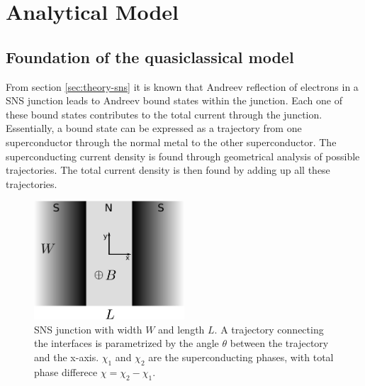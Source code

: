 \chapter{Analytical Model}
\label{ch:analyticalmodel}

\section{Foundation of the quasiclassical model}
From section \ref{sec:theory-sns} it is known that Andreev reflection of electrons in a SNS junction leads to Andreev bound states within the junction. Each one of these bound states contributes to the total current through the junction. Essentially, a bound state can be expressed as a trajectory from one superconductor through the normal metal to the other superconductor. The superconducting current density is found through geometrical analysis of possible trajectories. The total current density is then found by adding up all these trajectories.
\begin{figure}[h]
\centering	
\includegraphics[width=0.5\textwidth]{figure/analyticalmodel/sns_junction}
\caption{SNS junction with width $W$ and length $L$. A trajectory connecting the interfaces is parametrized by the angle $\theta$ between the trajectory and the x-axis. $\chi_1$ and $\chi_2$ are the superconducting phases, with total phase differece $\chi = \chi_2 - \chi_1$.}
\label{fig:sns_schematic}
\end{figure}
